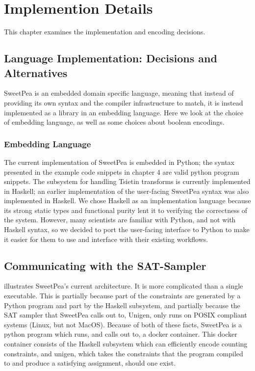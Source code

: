 
\chapter{Implemention Details}

This chapter examines the implementation and encoding decisions.

\section{Language Implementation: Decisions and Alternatives}

SweetPea is an embedded domain specific language, meaning that instead of providing its own syntax and the compiler infrastructure to match, it is instead implemented as a library in an embedding language. Here we look at the choice of embedding language, as well as some choices about boolean encodings.

\subsection{Embedding Language}

The current implementation of SweetPea is embedded in Python; the syntax presented in the example code snippets in chapter 4 are valid python program snippets. The subsystem for handling Tsietin transforms is currently implemented in Haskell; an earlier implementation of the user-facing SweetPea syntax was also implemented in Haskell. We chose Haskell as an implementation language because its strong static types and functional purity lent it to verifying the correctness of the system. However, many scientists are familiar with Python, and not with Haskell syntax, so we decided to port the user-facing interface to Python to make it easier for them to use and interface with their existing workflows.

\section{Communicating with the SAT-Sampler}

 illustrates SweetPea's current architecture. It is more complicated than a single executable. This is partially because part of the constraints are generated by a Python program and part by the Haskell subsystem, and partially because the SAT sampler that SweetPea calls out to, Unigen, only runs on POSIX compliant systems (Linux, but not MacOS). Because of both of these facts, SweetPea is a python program which runs, and calls out to, a docker container. This docker container consists of the Haskell subsystem which can efficiently encode counting constraints, and unigen, which takes the constraints that the program compiled to and produce a satisfying assignment, should one exist.

